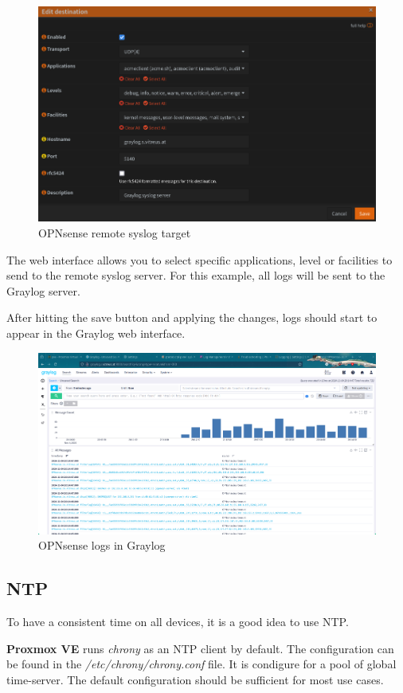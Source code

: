 \begin{figure}[H]
	\centering
	\includegraphics[width=0.8\linewidth]{Figures/opnsense-syslog-target.png}
	\caption{OPNsense remote syslog target}
\end{figure}
The web interface allows you to select specific applications, level or facilities to send to the remote syslog server. For this example, all logs will be sent to the Graylog server.

After hitting the save button and applying the changes, logs should start to appear in the Graylog web interface.

\begin{figure}[H]
	\centering
	\includegraphics[width=1\linewidth]{Figures/graylog-search-example-opnsense.png}
	\caption{OPNsense logs in Graylog}
\end{figure}

\subsection{NTP}

To have a consistent time on all devices, it is a good idea to use NTP. 

\textbf{Proxmox VE} runs \textit{chrony} as an NTP client by default. The configuration can be found in the \textit{/etc/chrony/chrony.conf} file. It is condigure for a pool of global time-server. The default configuration should be sufficient for most use cases.

